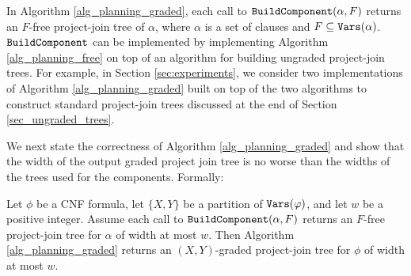 In Algorithm \ref{alg_planning_graded}, each call to $\texttt{\upshape BuildComponent}(\alpha, F)$ returns an $F$-free project-join tree of $\alpha$, where $\alpha$ is a set of clauses and $F \subseteq \texttt{\upshape Vars}(\alpha)$.
$\texttt{\upshape BuildComponent}$ can be implemented by implementing Algorithm \ref{alg_planning_free} on top of an algorithm for building ungraded project-join trees. 
For example, in Section \ref{sec:experiments}, we consider two implementations of Algorithm \ref{alg_planning_graded} built on top of the two algorithms to construct standard project-join trees \cite{dudek2020dpmc} discussed at the end of Section \ref{sec_ungraded_trees}.



We next state the correctness of Algorithm \ref{alg_planning_graded} and show that the width of the output graded project join tree is no worse than the widths of the trees used for the components. Formally:
\begin{theorem}
\label{thm:planning_graded_correctness}
Let $\phi$ be a CNF formula, let $\{X, Y\}$ be a partition of $\texttt{\upshape Vars}(\varphi)$, and let $w$ be a positive integer. 
Assume each call to $\texttt{\upshape BuildComponent}(\alpha, F)$ returns an $F$-free project-join tree for $\alpha$ of width at most $w$. 
Then Algorithm \ref{alg_planning_graded} returns an $(X,Y)$-graded project-join tree for $\phi$ of width at most $w$.
\end{theorem}


